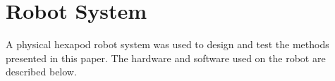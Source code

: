 \section{ Robot System }

A physical hexapod robot system was used to design and test the methods presented in this paper. The hardware and software used on the robot are described below.





% 
